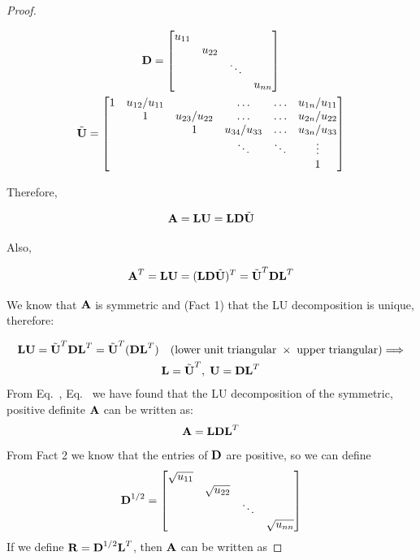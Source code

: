 \documentclass[a4paper]{article}
\numberwithin{equation}{section} %
\newcommand{\B}[1]{\textbf{\textup{#1}}} %
\renewcommand{\eqref}{Eq.~\originaleqref}
\renewcommand*{\eqref}[1]{Eq.~\originaleqref{#1}}
\begin{document}
\begin{proof}
\begin{itemize}
\begin{equation}
\begin{gathered}
\B{D}=
\begin{bmatrix}
u_{11} & & &\\
& u_{22} & &\\
& & \ddots &\\
& & & u_{nn}\\
\end{bmatrix} \\
\tilde{\B{U}}=
\begin{bmatrix}
1 & u_{12}/u_{11} & & \ldots & \ldots & u_{1n}/u_{11} \\
& 1 & u_{23}/u_{22}  & \ldots & \ldots & u_{2n}/u_{22} \\
& & 1 & u_{34}/u_{33} & \ldots & u_{3n}/u_{33}\\
&  & & \ddots & \ddots & \vdots \\
& & & & &1\\
\end{bmatrix}
\end{gathered}
\label{eq:lu_1}
\end{equation}

\end{itemize}

Therefore,

\[
\B{A}=\B{LU}=\B{LD}\tilde{\B{U}}
\]

Also,

\[
\B{A}^{T}=\B{LU}=(\B{LD}\tilde{\B{U}})^{T}=\tilde{\B{U}}^{T}\B{D}\B{L}^{T}
\]

We know that $\B{A}$ is symmetric and (Fact 1) that the LU decomposition is unique, therefore:

\begin{equation}
\begin{gathered}
\B{LU}=\tilde{\B{U}}^{T}\B{D}\B{L}^{T}=\tilde{\B{U}}^{T}(\B{D}\B{L}^{T})\quad (\mathrm{lower\; unit\; triangular} \; \times \; \mathrm{upper \; triangular}) \Longrightarrow \\
\B{L}=\tilde{\B{U}}^{T}, \; \B{U}=\B{D}\B{L}^{T}
\end{gathered}
\label{eq:lu_2}
\end{equation}
From  \eqref{eq:lu_1}, \eqref{eq:lu_2} we have found that the LU decomposition of the symmetric, positive definite $\B{A}$ can be written as:
\[
	\B{A}=\B{LD}\B{L}^T
\]
From Fact 2 we know that the entries of $\B{D}$ are positive, so we can define
\[
	\B{D}^{1/2}=
\begin{bmatrix}
\sqrt{u_{11}} & & &\\
& \sqrt{u_{22}} & &\\
& & \ddots &\\
& & & \sqrt{u_{nn}}\\
\end{bmatrix}
\]
If we define $\B{R}=\B{D}^{1/2}\B{L}^{T}$, then $\B{A}$ can be written as


\end{proof}
\end{document}
